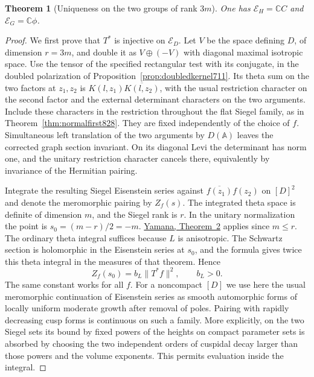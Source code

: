 \documentclass[a4paper,11pt]{article}
\newtheorem{theorem}[proposition]{Theorem}
\theoremstyle{definition}
\theoremstyle{remark}
\numberwithin{equation}{section}
\begin{document}
\begin{theorem}[Uniqueness on the two groups of rank \(3m\)]
\leavevmode\label{thm:carrierline831}
One has \(\mathcal E_H=\mathbb C C\) and
\(\mathcal E_G=\mathbb C\phi\).
\end{theorem}
\begin{proof}
We first prove that \(T^*\) is injective on \(\mathcal E_D\).
Let \(V\) be the space defining \(D\), of dimension \(r=3m\),
and double it as \(V\oplus(-V)\) with diagonal maximal
isotropic space. Use the tensor of the specified rectangular
test with its conjugate, in the doubled polarization of
Proposition~\ref{prop:doubledkernel711}. Its theta sum on
the two factors at \(z_1,z_2\) is
\(K(l,z_1)\overline{K(l,z_2)}\), with the usual restriction
character on the second factor and the external determinant
characters on the two arguments. Include these characters in
the restriction throughout the flat Siegel family, as in
Theorem~\ref{thm:normalfirst828}. They are fixed independently
of the choice of \(f\). Simultaneous left translation of the
two arguments by \(D(\mathbb A)\) leaves the corrected graph
section invariant. On its diagonal Levi the determinant has
norm one, and the unitary restriction character cancels
there, equivalently by invariance of the Hermitian pairing.

Integrate the resulting Siegel Eisenstein series against
\(\overline{f(z_1)}f(z_2)\) on \([D]^2\) and denote the
meromorphic pairing by \(Z_f(s)\). The integrated theta
space is definite of dimension \(m\), and the Siegel rank
is \(r\). In the unitary normalization the point is
\(s_0=(m-r)/2=-m\).
\href{https://msp.org/pjm/2013/264-1/pjm-v264-n1-p11-s.pdf}
{Yamana, Theorem~2} applies since \(m\le r\).
The ordinary theta integral suffices because \(L\) is
anisotropic. The Schwartz section is holomorphic in the
Eisenstein series at \(s_0\), and the formula gives twice
this theta integral in the measures of that theorem. Hence
\[
                  Z_f(s_0)=b_L\|T^*f\|^2,\qquad b_L>0 .
\]
The same constant works for all \(f\). For a noncompact
\([D]\) we use here the usual meromorphic continuation of
Eisenstein series as smooth automorphic forms of locally
uniform moderate growth after removal of poles. Pairing
with rapidly decreasing cusp forms is continuous on such
a family. More explicitly, on the two Siegel sets its
bound by fixed powers of the heights on compact parameter
sets is absorbed by choosing the two independent orders
of cuspidal decay larger than those powers and the volume
exponents. This permits evaluation inside the integral.


\end{proof}
\end{document}
